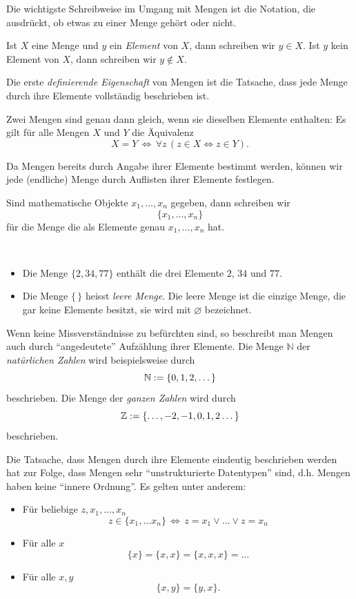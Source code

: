 Die wichtigste Schreibweise im Umgang mit Mengen ist die Notation, die ausdrückt, ob etwas zu einer Menge gehört oder nicht.

\begin{nt}
Ist $X$ eine Menge und $y$ ein \textit{Element} von $X$, dann schreiben wir $y\in X$. Ist $y$ kein Element von $X$, dann schreiben wir $y\notin X$.
\end{nt}

Die erste \textit{definierende Eigenschaft} von Mengen ist die Tatsache, dass jede Menge durch ihre Elemente vollständig beschrieben ist.

\begin{df}
Zwei Mengen sind genau dann gleich, wenn sie dieselben Elemente enthalten: Es gilt für alle Mengen $X$ und $Y$ die Äquivalenz
\[
X=Y\,\Leftrightarrow\,\forall z\, (z\in X\Leftrightarrow z\in Y).
\]
\end{df}

Da Mengen bereits durch Angabe ihrer Elemente bestimmt werden, können wir jede (endliche) Menge durch Auflisten ihrer Elemente festlegen.

\begin{df}
Sind mathematische Objekte $x_1,\dots,x_n$ gegeben, dann schreiben wir
\[
\{x_1,\dots,x_n\}
\]
für die Menge die als Elemente genau $x_1,\dots,x_n$ hat.
\end{df}

\begin{bsp}~
\begin{itemize}
\item Die Menge $\{2,34,77\}$ enthält die drei Elemente $2$, $34$ und $77$.
\item Die Menge $\{\,\}$ heisst \textit{leere Menge}. Die leere Menge ist die einzige Menge, die gar keine Elemente besitzt, sie wird mit $\varnothing $ bezeichnet.
\end{itemize}
\end{bsp}

\begin{rk}
Wenn keine Missverständnisse zu befürchten sind, so beschreibt man Mengen auch durch ``angedeutete'' Aufzählung ihrer Elemente. Die Menge $\mathbb{N}$ der \textit{natürlichen Zahlen} wird beispielsweise durch
\[
\mathbb{N}:=\{0,1,2,\dots\}
\]
beschrieben. Die Menge der \textit{ganzen Zahlen} wird durch
\[
\mathbb{Z}:=\{\dots, -2,-1,0,1,2\dots\}
\]
beschrieben.
\end{rk}

\begin{rk}
Die Tatsache, dass Mengen durch ihre Elemente eindeutig beschrieben werden hat zur Folge, dass Mengen sehr ``unstrukturierte Datentypen'' sind, d.h. Mengen haben keine ``innere Ordnung''. Es gelten unter anderem:
\begin{itemize}
\item Für beliebige $z,x_1,\dots,x_n$
\[
z\in\{x_1,\dots x_n\}\,\Leftrightarrow\, z=x_1\lor\dots\lor z=x_n
\]
\item Für alle $x$
\[
\{x\}=\{x,x\}=\{x,x,x\}=\dots
\]
\item Für alle $x,y$
\[
\{x,y\}=\{y,x\}.
\]
\end{itemize}
\end{rk}

